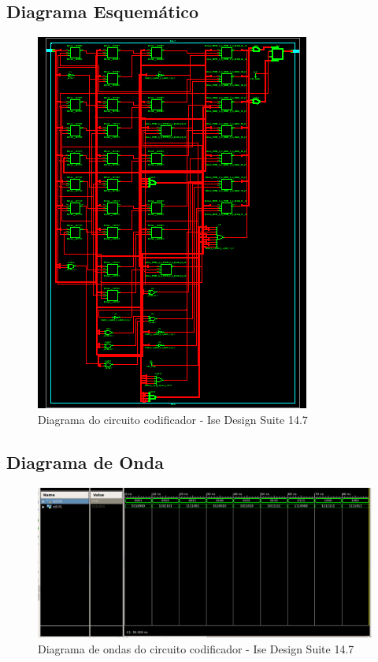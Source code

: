 \documentclass[12pts]{article}
\begin{document}
\subsection{Diagrama Esquemático}
\begin{figure}[!htb]
  \centering
  \includegraphics[scale=0.6]{imagens/circuito}
  \caption{Diagrama do circuito codificador - Ise Design Suite 14.7}	
  \label{figRotulo}
\end{figure}

\newpage
\subsection{Diagrama de Onda}

\begin{figure}[!htb]
  \centering
  \includegraphics[scale=0.35]{imagens/onda}
  \caption{Diagrama de ondas do circuito codificador - Ise Design Suite 14.7}
  \label{figRotulo}
\end{figure}
\newpage
\end{document}

